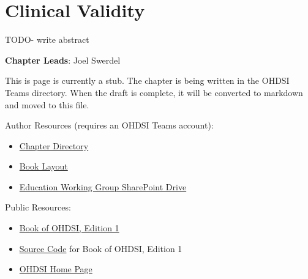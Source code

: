 \documentclass[
  letterpaper,
  paper=7in:10in,
  pagesize=pdftex,
  headinclude=on,
  footinclude=on,
  12pt]{scrbook}
\providecommand{\tightlist}{%
  \setlength{\itemsep}{0pt}\setlength{\parskip}{0pt}}\usepackage{longtable,booktabs,array}
\begin{document}
\chapter{Clinical Validity}\label{sec-quality-clinical}

TODO- write abstract

\hfill\break

\textbf{Chapter Leads}: Joel Swerdel

\begin{tcolorbox}[enhanced jigsaw, opacitybacktitle=0.6, coltitle=black, colback=white, bottomrule=.15mm, bottomtitle=1mm, title=\textcolor{quarto-callout-note-color}{\faInfo}\hspace{0.5em}{Note}, titlerule=0mm, rightrule=.15mm, colbacktitle=quarto-callout-note-color!10!white, colframe=quarto-callout-note-color-frame, toptitle=1mm, arc=.35mm, left=2mm, breakable, opacityback=0, leftrule=.75mm, toprule=.15mm]

This is page is currently a stub. The chapter is being written in the
OHDSI Teams directory. When the draft is complete, it will be converted
to markdown and moved to this file.

Author Resources (requires an OHDSI Teams account):

\begin{itemize}
\tightlist
\item
  \href{https://ohdsiorg.sharepoint.com/sites/Workgroup-EducationWorkingGroup/Shared\%20Documents/Forms/AllItems.aspx?id=\%2Fsites\%2FWorkgroup\%2DEducationWorkingGroup\%2FShared\%20Documents\%2FSection\%20IV\%20\%2D\%20Quality\%2FChapter\%2017\%20\%2D\%20Cohort\%20Validity&viewid=05fec2cc\%2Dec8a\%2D4d04\%2Db565\%2Dcf1289b96f67}{Chapter
  Directory}
\item
  \href{https://ohdsiorg.sharepoint.com/:x:/r/sites/Workgroup-EducationWorkingGroup/_layouts/15/Doc2.aspx?action=edit&sourcedoc=\%7B1fa31e39-1c5f-4918-b878-609ebd9810b3\%7D&wdOrigin=TEAMS-WEB.teamsSdk_ns.rwc&wdExp=TEAMS-TREATMENT&wdhostclicktime=1748104477731&web=1}{Book
  Layout}
\item
  \href{https://ohdsiorg.sharepoint.com/sites/Workgroup-EducationWorkingGroup/Shared\%20Documents/Forms/AllItems.aspx?viewid=05fec2cc\%2Dec8a\%2D4d04\%2Db565\%2Dcf1289b96f67}{Education
  Working Group SharePoint Drive}
\end{itemize}

Public Resources:

\begin{itemize}
\tightlist
\item
  \href{https://ohdsi.github.io/TheBookOfOhdsi/}{Book of OHDSI, Edition
  1}
\item
  \href{https://github.com/OHDSI/TheBookOfOhdsi}{Source Code} for Book
  of OHDSI, Edition 1
\item
  \href{https://ohdsi.org/}{OHDSI Home Page}
\end{itemize}

\end{tcolorbox}
\end{document}
